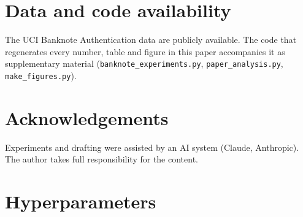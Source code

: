 \documentclass{article}
\theoremstyle{definition}
\theoremstyle{remark}
\begin{document}
\section*{Data and code availability}
The UCI Banknote Authentication data are publicly available. The code that regenerates every number, table and figure in this paper accompanies it as supplementary material (\texttt{banknote\_experiments.py}, \texttt{paper\_analysis.py}, \texttt{make\_figures.py}).

\section*{Acknowledgements}
Experiments and drafting were assisted by an AI system (Claude, Anthropic). The author takes full responsibility for the content.




\appendix

\section{Hyperparameters}
\label{app:hyper}
\end{document}
